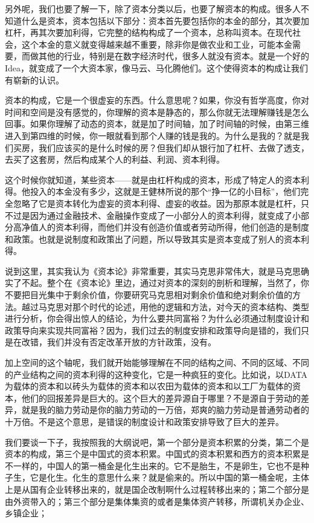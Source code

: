 \documentclass[UTF8, 12pt, a4paper]{ctexrep}
\begin{document}
另外呢，我们也要了解一下，除了资本分类以后，也要了解资本的构成。很多人不知道什么是资本，资本包括以下部分：资本首先要包括你的本金的部分，其次要加杠杆，再其次要加利得，它完整的结构构成了一个资本，总称叫资本。在现代社会，这个本金的意义就变得越来越不重要，除非你是做农业和工业，可能本金需要，而做其他的行业，特别是在数字经济时代，很多人就没有资本。就是一个好的Idea，就变成了一个大资本家，像马云、马化腾他们。这个使得资本的构成让我们有崭新的认识。

资本的构成，它是一个很虚妄的东西。什么意思呢？如果，你没有哲学高度，你对时间和空间是没有感觉的，你理解的资本是静态的，那么你就无法理解赚钱是怎么回事。如果你理解了动态的资本，就是加了时间轴，加了时间轴的时候，由第三维进入到第四维的时候，你一眼就看到那个人赚的钱是我的。为什么是我的？就是我们买房，我们应该买的是什么时候的房？但我们却从银行加了杠杆、去做了透支，去买了这套房，然后构成某个人的利益、利润、资本利得。

这个时候你就知道，某些资本——就是由杠杆构成的资本，形成了特定人的资本利得。他投入的本金没有多少，这就是王健林所说的那个“挣一亿的小目标”，他们完全忽略了它是资本转化为虚妄的资本利得、虚妄的收益。因为那原本就是杠杆，只不过是因为通过金融技术、金融操作变成了一小部分人的资本利得，就变成了小部分高净值人的资本利得，而他们并没有创造价值或者劳动所得，他们创造的是制度和政策。也就是说制度和政策出了问题，所以导致其实是资本变成了别人的资本利得。

说到这里，其实我认为《资本论》非常重要，其实马克思非常伟大，就是马克思确实了不起。整个在《资本论》里边，通过对资本的深刻的剖析和理解，当然了，你不要把目光集中于剩余价值，你要研究马克思相对剩余价值和绝对剩余价值的方法。越过马克思对那个时代的论述，用他的逻辑和方法，对今天的资本结构、类型进行分析，你会得出惊人的结论，为什么要共同富裕？为什么必须通过制度设计和政策导向来实现共同富裕？因为，我们过去的制度安排和政策导向是错的，我们只是在改错，我们并没有否定改革开放的方针政策，没有。

加上空间的这个轴呢，我们就开始能够理解在不同的结构之间、不同的区域、不同的产业结构之间的资本利得的这种变化，它是一种疯狂的变化。比如说，以DATA为载体的资本和以砖头为载体的资本和以农田为载体的资本和以工厂为载体的资本，他们的回报差异是巨大的。这个巨大的差异源自于哪里？不是源自于劳动的差异，就是我的脑力劳动是你的脑力劳动的一万倍，郑爽的脑力劳动是普通劳动者的十万倍。不是这个意思，是错误的制度设计和政策安排导致了巨大的差异。

我们要谈一下子，我按照我的大纲说吧，第一个部分是资本积累的分类，第二个是资本的构成，第三个是中国式的资本积累。中国式的资本积累和西方的资本积累是不一样的，中国人的第一桶金是化生出来的。它不是胎生，不是卵生，它也不是种子生，它是化生。化生的意思什么来？就是偷来的。所以中国的第一桶金呢，主体上是从国有企业转移出来的，就是国企改制啊什么过程转移出来的；第二个部分是由外资带入的；第三个部分是集体集资的或者是集体资产转移，所谓机关办企业、乡镇企业；
\end{document}
